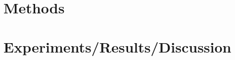 \documentclass[10]{article}
\begin{document}
\section*{Methods}

\section*{Experiments/Results/Discussion}
\end{document}
